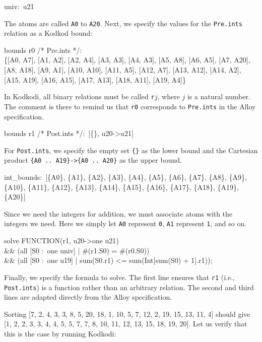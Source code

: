 \documentclass[a4paper,12pt]{article}
\begin{document}
\begin{enum}
\pre
\ttfamily\small
univ:~u21
\post

The atoms are called \texttt{A0} to \texttt{A20}. Next, we specify the values
for the \texttt{Pre.ints} relation as a Kodkod bound:

\pre
\ttfamily\small
bounds r0 /* Pre.ints */: \\
\{[A0, A7], [A1, A2], [A2, A4], [A3, A3], [A4, A3], [A5, A8], [A6, A5],
 [A7, A20], [A8, A18], [A9, A1], [A10, A10], [A11, A5], [A12, A7], [A13, A12],
 [A14, A2], [A15, A19], [A16, A15], [A17, A13], [A18, A11], [A19, A4]\}
\post

In Kodkodi, all binary relations must be called \texttt{r$j$}, where $j$ is a
natural number. The comment is there to remind us that \texttt{r0} corresponds
to \texttt{Pre.ints} in the Alloy specification.

\pre
\ttfamily\small
bounds r1 /* Post.ints */:~[\{\}, u20->u21]
\post

For \texttt{Post.ints}, we specify the empty set \texttt{\{\}} as the lower
bound and the Cartesian product \texttt{\{A0 {..}~A19\}->\{A0 {.{.}}~A20\}} as
the upper bound.

\pre
\ttfamily\small
int\_bounds:~[\{A0\}, \{A1\}, \{A2\}, \{A3\}, \{A4\}, \{A5\}, \{A6\}, \{A7\},
\{A8\}, \{A9\}, \{A10\}, \{A11\}, \{A12\}, \{A13\}, \{A14\}, \{A15\}, \{A16\},
\{A17\}, \{A18\}, \{A19\}, \{A20\}]
\post

Since we need the integers for addition, we must associate atoms with the
integers we need. Here we simply let \texttt{A0} represent \texttt{0},
\texttt{A1} represent \texttt{1}, and so on.

\pre
\ttfamily\small
solve FUNCTION(r1, u20->one u21) \\
\&\& (all [S0 :~one univ] | \#(r1.S0) = \#(r0.S0)) \\
\&\& (all [S0 :~one u19] | sum(S0.r1) <= sum(Int[sum(S0) + 1].r1));
\post

Finally, we specify the formula to solve. The first line ensures that
\texttt{r1} (i.e., \texttt{Post.ints}) is a function rather than an arbitrary
relation. The second and third lines are adapted directly from the Alloy
specification.

Sorting [7, 2, 4, 3, 3, 8, 5, 20, 18, 1, 10, 5, 7, 12, 2, 19, 15, 13, 11, 4]
should give [1, 2, 2, 3, 3, 4, 4, 5, 5, 7, 7, 8, 10, 11, 12, 13, 15, 18, 19,
20]. Let us verify that this is the case by running Kodkodi:


\end{enum}
\end{document}
